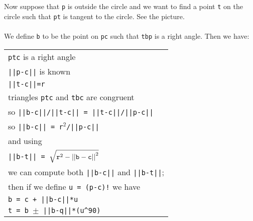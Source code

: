 \documentclass[12pt]{article}
\begin{document}
\begin{minipage}{\textwidth}\raggedright
\label{TANGENT-PICTURE}
\begin{wrapfigure}{r}{0.3\textwidth}
\end{wrapfigure}
Now suppose that {\tt p} is outside the circle and we want to find
a point {\tt t} on the circle such that {\tt pt} is tangent to the
circle.  See the picture. \\
~ \\
We define {\tt b} to be the point on {\tt pc} such that
{\tt tbp} is a right angle.  Then we have: \\
\hspace*{0.2in}\begin{tabular}{@{}l} \\
    {\tt ptc} is a right angle \\
    {\tt ||p-c||} is known \\
    {\tt ||t-c||=r} \\
    triangles {\tt ptc} and {\tt tbc} are congruent \\
    so {\tt \small ||b-c||/||t-c|| = ||t-c||/||p-c||} \\
    so {\tt \small ||b-c|| = r$^2$/||p-c||} \\
    and using \\
    {\tt ||b-t|| = $\sqrt{{\tt r}^2 - {\tt ||b-c||}^2}$} \\
    we can compute both {\tt ||b-c||} and {\tt ||b-t||}; \\
    then if we define {\tt u = (p-c)!} we have \\
    {\tt b = c + ||b-c||*u} \\
    {\tt t = b $\pm$ ||b-q||*(u\textasciicircum 90)} \\
    \end{tabular}
\end{minipage}
\end{document}
